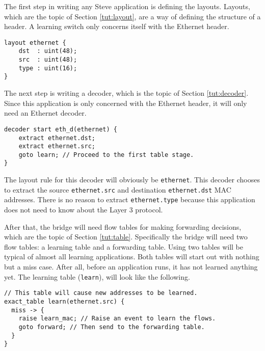 The first step in writing any Steve application is defining the layouts.
Layouts, which are the topic of Section \ref{tut:layout}, are a way of defining the structure of a header.
A learning switch only concerns itself with the Ethernet header.

\begin{codepage}
\begin{lstlisting}
layout ethernet {
	dst  : uint(48);
	src  : uint(48);
	type : uint(16);
}
\end{lstlisting}
\end{codepage}

The next step is writing a decoder, which is the topic of Section \ref{tut:decoder}.
Since this application is only concerned with the
Ethernet header, it will only need an Ethernet decoder. 

\begin{codepage}
\begin{lstlisting}
decoder start eth_d(ethernet) {
	extract ethernet.dst;
	extract ethernet.src;
	goto learn; // Proceed to the first table stage.
}
\end{lstlisting}
\end{codepage}

The layout rule for this decoder will obviously be \texttt{ethernet}. This decoder chooses to extract the source \texttt{ethernet.src} and destination \texttt{ethernet.dst} MAC addresses.
There is no reason to extract \texttt{ethernet.type} because this application does not need to know about the Layer 3 protocol.


After that, the bridge will need flow tables for making forwarding decisions, which are the topic of Section \ref{tut:table}.
Specifically the bridge will need two flow tables: a learning table and a forwarding table.
Using two tables will be typical of almost all learning applications. Both
tables will start out with nothing but a miss case. After all, before an
application runs, it has not learned anything yet. 
The learning table (\texttt{learn}), will look like the following.

\begin{codepage}
\begin{lstlisting}
// This table will cause new addresses to be learned.
exact_table learn(ethernet.src) {
  miss -> {
  	raise learn_mac; // Raise an event to learn the flows.
    goto forward; // Then send to the forwarding table.
  }
}
\end{lstlisting}
\end{codepage}


